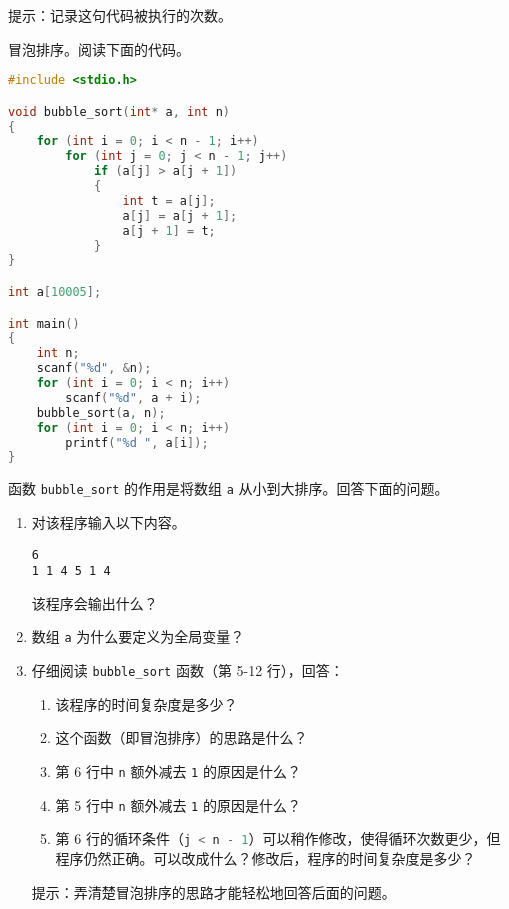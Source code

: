 \begin{problemset}
\begin{enumerate}
		提示：记录这句代码被执行的次数。
	\end{enumerate}

	\item 冒泡排序。阅读下面的代码。

	\begin{lstlisting}[language=c, moreemph={[2]bubble_sort}]
#include <stdio.h>

void bubble_sort(int* a, int n)
{
	for (int i = 0; i < n - 1; i++)
		for (int j = 0; j < n - 1; j++)
			if (a[j] > a[j + 1])
			{
				int t = a[j];
				a[j] = a[j + 1];
				a[j + 1] = t;
			}
}

int a[10005];

int main()
{
	int n;
	scanf("%d", &n);
	for (int i = 0; i < n; i++)
		scanf("%d", a + i);
	bubble_sort(a, n);
	for (int i = 0; i < n; i++)
		printf("%d ", a[i]);
}
	\end{lstlisting}

	函数 \lstinline[language=c, moreemph={[2]bubble_sort}]{bubble_sort} 的作用是将数组 \lstinline{a} 从小到大排序。回答下面的问题。

	\begin{enumerate}
		\item 对该程序输入以下内容。

		\begin{lstlisting}[numbers=none]
6
1 1 4 5 1 4
		\end{lstlisting}

		该程序会输出什么？

		\item 数组 \lstinline{a} 为什么要定义为全局变量？

		\item 仔细阅读 \lstinline[language=c, moreemph={[2]bubble_sort}]{bubble_sort} 函数（第 5-12 行），回答：
		\begin{enumerate}
			\item 该程序的时间复杂度是多少？
			\item 这个函数（即冒泡排序）的思路是什么？
			\item 第 6 行中 \lstinline{n} 额外减去 \lstinline{1} 的原因是什么？
			\item 第 5 行中 \lstinline{n} 额外减去 \lstinline{1} 的原因是什么？
			\item 第 6 行的循环条件（\lstinline[language=c]{j < n - 1}）可以稍作修改，使得循环次数更少，但程序仍然正确。可以改成什么？修改后，程序的时间复杂度是多少？
		\end{enumerate}

		提示：弄清楚冒泡排序的思路才能轻松地回答后面的问题。


\end{enumerate}
\end{problemset}
